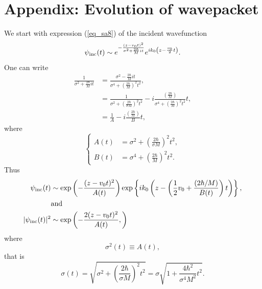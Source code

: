 \section{Appendix: Evolution of wavepacket}
We start with expression (\ref{eq_sa8}) of the incident wavefunction
\begin{equation}
\nonumber
\psi_{\rm inc}(t) \sim e^{- \frac{(z-v_0 t)^2}{\sigma^2 + \frac{2 \hbar}{M} i t}} e^{i k_0 \left( z - \frac{v_0}{2} t \right)}.
\end{equation}
One can write
\begin{equation}
\nonumber
\begin{split}
\frac{1}{\sigma^2 + \frac{2 \hbar}{M} i t} &= \frac{\sigma^2 - \frac{2 \hbar}{M} i t}{\sigma^4 + \left( \frac{2 \hbar}{M} \right)^2 t^2}, \\
&= \frac{1}{\sigma^2 + \left( \frac{2 \hbar}{\sigma M} \right)^2 t^2} - i \frac{\left( \frac{2\hbar}{M} \right)}{\sigma^4 + \left( \frac{2 \hbar}{M} \right)^2 t^2} t, \\
&= \frac{1}{A} - i \frac{\left( \frac{2\hbar}{M} \right)}{B} t,
\end{split}
\end{equation}
where
\begin{equation}
\nonumber
\left\{
\begin{split}
A(t) &= \sigma^2 + \left( \frac{2\hbar}{\sigma M} \right)^2 t^2, \\
B(t) &= \sigma^4 + \left( \frac{2\hbar}{M} \right)^2 t^2.
\end{split}
\right.
\end{equation}
Thus
\begin{equation}
\nonumber
\begin{split}
\psi_{\rm inc}(t) &\sim {\rm exp} \left( -\frac{(z - v_0 t)^2}{A(t)} \right) {\rm exp} \left\{ i k_0 \left( z - \left( \frac{1}{2} v_0 + \frac{(2 \hbar/M)}{B(t)} \right) t \right) \right\}, \\
&\text{and}\\
|\psi_{\rm inc}(t)|^2 &\sim {\rm exp} \left( - \frac{2 (z - v_0 t)^2}{A(t)}, \right)
\end{split}
\end{equation}
where
\begin{equation}
\nonumber
\sigma^2(t) \equiv A(t),
\end{equation}
that is 
\begin{equation}
\nonumber
\sigma(t) = \sqrt{\sigma^2 + \left( \frac{2 \hbar}{\sigma M} \right)^2 t^2} = \sigma \sqrt{1 + \frac{4 \hbar^2}{\sigma^4 M^2} t^2}.
\end{equation}
